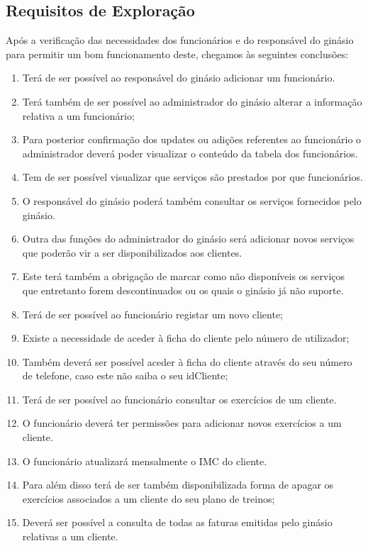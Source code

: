 \subsection{Requisitos de Exploração}
\label{subsec:requisitos}
Após a verificação das necessidades dos funcionários e do responsável do ginásio para permitir um bom funcionamento deste, chegamos às seguintes conclusões:

\begin{enumerate} 
    \item Terá de ser possível ao responsável do ginásio adicionar um funcionário.
    \item Terá também  de ser possível ao administrador do ginásio alterar a informação relativa a um funcionário;
    \item Para posterior confirmação dos updates ou adições referentes ao funcionário o administrador deverá poder visualizar o conteúdo da tabela dos funcionários.
    \item Tem de ser possível visualizar que serviços são prestados por que funcionários. 
    \item O responsável do ginásio poderá também consultar os serviços fornecidos pelo ginásio.
    \item Outra das funções do administrador do ginásio será adicionar novos serviços que poderão vir a ser disponibilizados aos clientes.
    \item Este terá também a obrigação de marcar como não disponíveis os serviços que entretanto forem descontinuados ou os quais o ginásio já não suporte.
    \item Terá de ser possível ao funcionário registar um novo cliente;
    \item Existe a necessidade de aceder à ficha do cliente pelo número de utilizador;
    \item Também deverá ser possível aceder à ficha do cliente através do seu número de telefone, caso este não saiba o seu idCliente;
    \item Terá de ser possível ao funcionário consultar os exercícios de um cliente.
    \item O funcionário deverá ter permissões para adicionar novos exercícios a um cliente.
    \item O funcionário atualizará mensalmente o IMC do cliente.
    \item Para além disso terá de ser também disponibilizada forma de apagar os exercícios associados a um cliente do seu plano de treinos;
    \item Deverá ser possível a consulta de todas as faturas emitidas pelo ginásio relativas a um cliente.

\end{enumerate}
